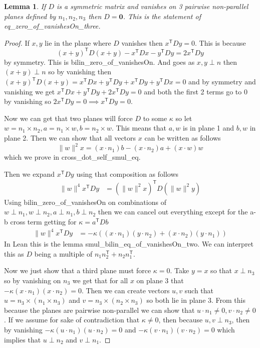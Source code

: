 \documentclass[10pt]{article}
\theoremstyle{plain}
\newtheorem{lemma}[theorem]{Lemma}
\theoremstyle{definition}
\theoremstyle{remark}
\newcommand{\T}{^{\mathsf{T}}}
\newcommand{\lean}[1]{{\ttfamily\let\us\_\def\_{\us\allowbreak}#1}}
\begin{document}
\begin{lemma}
  If $D$ is a symmetric matrix and vanishes on 3 pairwise non-parallel planes defined by $n_1,n_2,n_3$ then $D=\mathbf{0}$. This is the statement of \lean{eq\_zero\_of\_vanishesOn\_three}.
\end{lemma}
\begin{proof}
  If $x,y$ lie in the plane where $D$ vanishes then $x\T Dy=0$. This is because $$(x+y)\T D(x+y)-x\T Dx-y\T Dy=2x\T Dy$$ by symmetry. This is \lean{bilin\_zero\_of\_vanishesOn}. And goes as $x,y \perp n$ then $(x+y) \perp n$ so by vanishing then $(x+y)\T D(x+y)=x\T Dx+y\T Dy+x\T Dy+y\T Dx=0$ and by symmetry and vanishing we get $x\T Dx+y\T Dy+2x\T Dy=0$ and both the first 2 terms go to 0 by vanishing so $2x\T Dy =0 \implies x\T Dy=0$.

  Now we can get that two planes will force $D$ to some $\kappa$ so let $w=n_1\times n_2, a=n_1 \times w, b=n_2 \times w$. This means that $a, w$ is in plane 1 and $b,w$ in plane 2. Then we can show that all vectors $x$ can be written as follows
  $$\|w\|^2x=(x \cdot n_1)b-(x \cdot n_2)a + (x \cdot w)w$$
  which we prove in \lean{cross\_dot\_self\_smul\_eq}.

  Then we expand $x\T Dy$ using that composition as follows
  \begin{align*}
    \|w\|^4x\T Dy &= (\|w\|^2x)\T D(\|w\|^2y)
  \end{align*}
  Using \lean{bilin\_zero\_of\_vanishesOn} on combinations of $w \perp n_1, w \perp n_2, a \perp n_1, b \perp n_2$ then we can cancel out everything except for the a-b cross term getting for $\kappa =a\T Db$
  \begin{align*}
    \|w\|^4x\T Dy &= -\kappa((x \cdot n_1)(y \cdot n_2) + (x \cdot n_2)(y \cdot n_1))
  \end{align*}
  In Lean this is the lemma \lean{smul\_bilin\_eq\_of\_vanishesOn\_two}. We can interpret this as $D$ being a multiple of $n_1n_2\T +n_2n_1\T $.

  Now we just show that a third plane must force $\kappa=0$. Take $y=x$ so that $x \perp n_3$ so by vanishing on $n_3$ we get that for all $x$ on plane 3 that $-\kappa(x\cdot n_1)(x \cdot n_2)=0$. Then we can create vectors $u,v$ such that $u=n_3 \times (n_1 \times n_3)$ and $v=n_3 \times (n_2 \times n_3)$ so both lie in plane 3. From this because the planes are pairwise non-parallel we can show that $u \cdot n_1 \neq 0, v \cdot n_2 \neq 0$. If we assume for sake of contradiction that $\kappa \neq 0$, then because $u,v \perp n_3$, then by vanishing $-\kappa (u\cdot n_1)(u \cdot n_2)=0$ and $-\kappa (v\cdot n_1)(v \cdot n_2)=0$ which implies that $u \perp n_2$ and $v \perp n_1$.


\end{proof}
\end{document}
